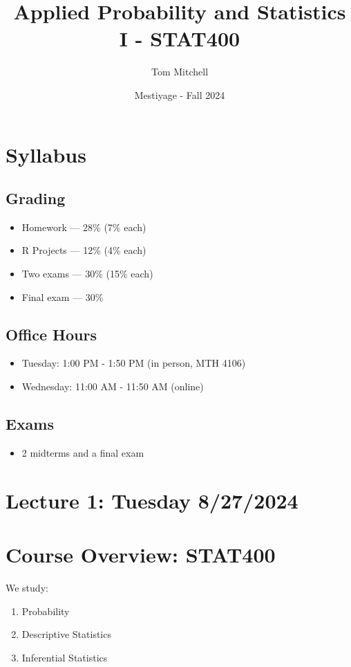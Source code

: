 \documentclass{article}
\title{Applied Probability and Statistics I - STAT400}
\author{Tom Mitchell}
\date{Mestiyage - Fall 2024}
\begin{document}
\maketitle

\section*{Syllabus}

\subsection*{Grading}
\begin{itemize}
    \item Homework — 28\% (7\% each)
    \item R Projects — 12\% (4\% each)
    \item Two exams — 30\% (15\% each)
    \item Final exam — 30\%
\end{itemize}

\subsection*{Office Hours}
\begin{itemize}
    \item Tuesday: 1:00 PM - 1:50 PM (in person, MTH 4106)
    \item Wednesday: 11:00 AM - 11:50 AM (online)
\end{itemize}

\subsection*{Exams}
\begin{itemize}
    \item 2 midterms and a final exam
\end{itemize}

\pagebreak

\section*{Lecture 1: Tuesday 8/27/2024}

\section*{Course Overview: STAT400}
We study:
\begin{enumerate}
    \item Probability
    \item Descriptive Statistics
    \item Inferential Statistics
\end{enumerate}
\end{document}
